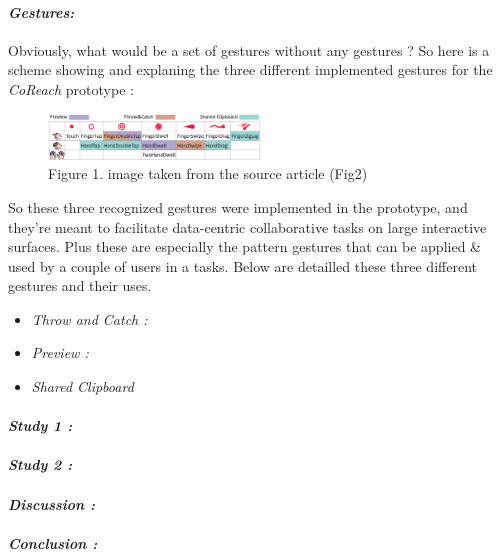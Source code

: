     \paragraph{\textit{Gestures:} \newline}
    \indent \indent Obviously, what would be a set of gestures without any gestures ? So here is a scheme showing and explaning the three different
    implemented gestures for the \textit{CoReach} prototype :
    
                
    \begin{figure}[h]
        \centering
        \includegraphics[width=0.5\textwidth]{images/RecognizedGestures.png}
        \caption{Figure 1. image taken from the source article (Fig2)}
        \label{fig:myimage}
    \end{figure}
    
    \indent \indent So these three recognized gestures were implemented in the prototype, and they're meant to facilitate data-centric
    collaborative tasks on large interactive surfaces. Plus these are especially the pattern gestures that can be applied \& used by a couple of users in a 
    tasks. Below are detailled these three different gestures and their uses.

    \begin{itemize}
        \item \textit{Throw and Catch :} \newline 
        \item \textit{Preview :} \newline 
        \item \textit{Shared Clipboard} \newline 
    \end{itemize}

    \paragraph{ \textit{Study 1 :}
                \newline}
    
    \paragraph{ \textit{Study 2 :}
                \newline 
                \indent \indent \textnormal{} }
            
    \paragraph{ \textit{Discussion :}
                \newline
                \indent \indent \textnormal{} }
    
    \paragraph{ \textit{Conclusion :}
                \newline
                \indent \indent \textnormal{} }
    